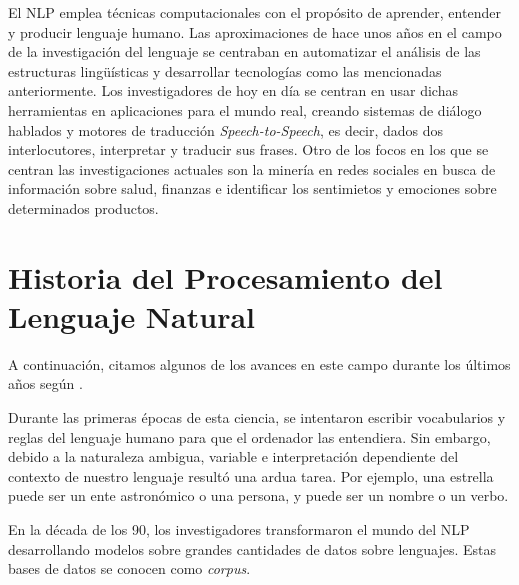 El \ac{NLP} emplea técnicas computacionales con el propósito de aprender,
entender y producir lenguaje humano. Las aproximaciones de hace unos años en el
campo de la investigación del lenguaje se centraban en automatizar el análisis
de las estructuras lingüísticas y desarrollar tecnologías como las mencionadas
anteriormente. Los investigadores de hoy en día se centran en usar dichas
herramientas en aplicaciones para el mundo real, creando sistemas de diálogo
hablados y motores de traducción \emph{Speech-to-Speech}, es decir, dados dos
interlocutores, interpretar y traducir sus frases. Otro de los focos en los que
se centran las investigaciones actuales son la minería en redes sociales en
busca de información sobre salud, finanzas e identificar los sentimietos y
emociones sobre determinados productos. 

\section{Historia del Procesamiento del Lenguaje Natural}
\label{sec:currentnlp}

A continuación, citamos algunos de los avances en este campo durante los últimos
años según \citeauthor{Hirschberg261} \citep{Hirschberg261}.

Durante las primeras épocas de esta ciencia, se intentaron escribir vocabularios
y reglas del lenguaje humano para que el ordenador las entendiera. Sin embargo,
debido a la naturaleza ambigua, variable e interpretación dependiente del
contexto de nuestro lenguaje resultó una ardua tarea. Por ejemplo, una estrella
puede ser un ente astronómico o una persona, y puede ser un nombre o un verbo.

En la década de los 90, los investigadores transformaron el mundo del \ac{NLP}
desarrollando modelos sobre grandes cantidades de datos sobre lenguajes. Estas
bases de datos se conocen como \emph{corpus}. 